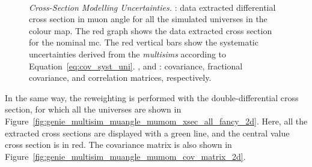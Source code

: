 \begin{figure}[t]
{   \label{fig:genie_multisim_muangle_corr_matrix_2d}} \\
\caption[Cross-Section Modelling Uncertainties - Cross Section in $\cos\theta_\mu$]{\emph{Cross-Section Modelling Uncertainties.} \protect{}: data extracted differential cross section in muon angle for all the simulated universes in the colour map. The red graph shows  the data extracted cross section for the nominal \acrshort{mc}. The red vertical bars show the \g systematic uncertainties derived from the \emph{multisims} according to Equation~\eqref{eq:cov_syst_uni}.  \protect{}, \protect{} and \protect{}: covariance, fractional covariance, and correlation matrices, respectively.}
\label{fig:genie_multisim_muangle}
\end{figure}


In the same way, the reweighting is performed with the double-differential cross section, for which all the universes are shown in Figure~\ref{fig:genie_multisim_muangle_mumom_xsec_all_fancy_2d}. Here, all the extracted cross sections are displayed with a green line, and the central value cross section is in red. The covariance matrix is also shown in Figure~\ref{fig:genie_multisim_muangle_mumom_cov_matrix_2d}.

